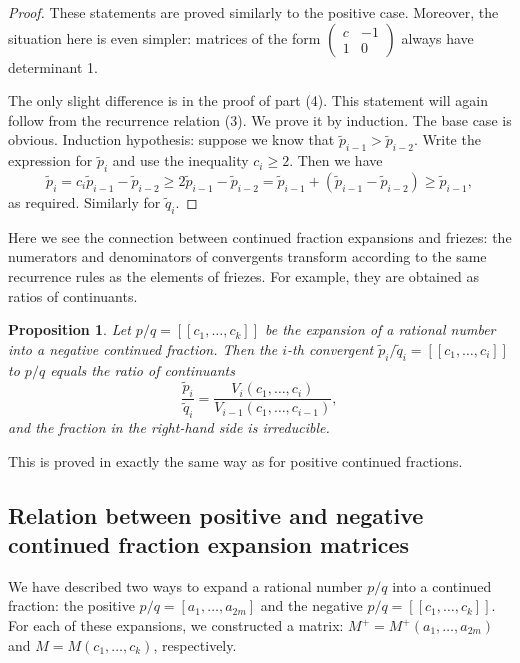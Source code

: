 \documentclass[a4paper,11pt]{amsart}
\theoremstyle{plain}
\newtheorem{prop}[theorem]{Proposition}
\theoremstyle{remark}
\theoremstyle{definition}
\numberwithin{equation}{section}
\numberwithin{figure}{section}
\begin{document}
\begin{proof}
These statements are proved similarly to the positive case. Moreover, the situation here is even simpler: matrices of the form $\begin{pmatrix}c & -1\\1 & 0\end{pmatrix}$ always have determinant 1.

The only slight difference is in the proof of part (4). This statement will again follow from the recurrence relation (3). We prove it by induction. The base case is obvious. Induction hypothesis: suppose we know that $\tilde{p}_{i-1} > \tilde{p}_{i-2}$. Write the expression for $\tilde{p}_i$ and use the inequality $c_i \geq 2$. Then we have
\[
\tilde{p}_i = c_i \tilde{p}_{i-1} - \tilde{p}_{i-2} \geq 2 \tilde{p}_{i-1} - \tilde{p}_{i-2} = \tilde{p}_{i-1} + (\tilde{p}_{i-1} - \tilde{p}_{i-2}) \geq \tilde{p}_{i-1},
\]
as required. Similarly for $\tilde{q}_i$.
\end{proof}

Here we see the connection between continued fraction expansions and friezes: the numerators and denominators of convergents transform according to the same recurrence rules as the elements of friezes. For example, they are obtained as ratios of continuants.

\begin{prop} Let $p/q = [[c_1, \dots, c_k]]$ be the expansion of a rational number into a negative continued fraction. Then the $i$-th convergent $\tilde{p}_i/\tilde{q}_i = [[c_1, \dots, c_i]]$ to $p/q$ equals the ratio of continuants
\[
\frac{\tilde{p}_i}{\tilde{q}_i} = \frac{V_i(c_1, \dots, c_i)}{V_{i-1}(c_1, \dots, c_{i-1})}, 
\]
and the fraction in the right-hand side is irreducible.
\end{prop}

This is proved in exactly the same way as for positive continued fractions.

\subsection{Relation between positive and negative continued fraction expansion matrices}

We have described two ways to expand a rational number $p/q$ into a continued fraction: the positive $p/q = [a_1, \dots, a_{2m}]$ and the negative $p/q = [[c_1, \dots, c_k]]$. For each of these expansions, we constructed a matrix: $M^+ = M^+(a_1, \dots, a_{2m})$ and $M = M(c_1, \dots, c_k)$, respectively.
\end{document}
